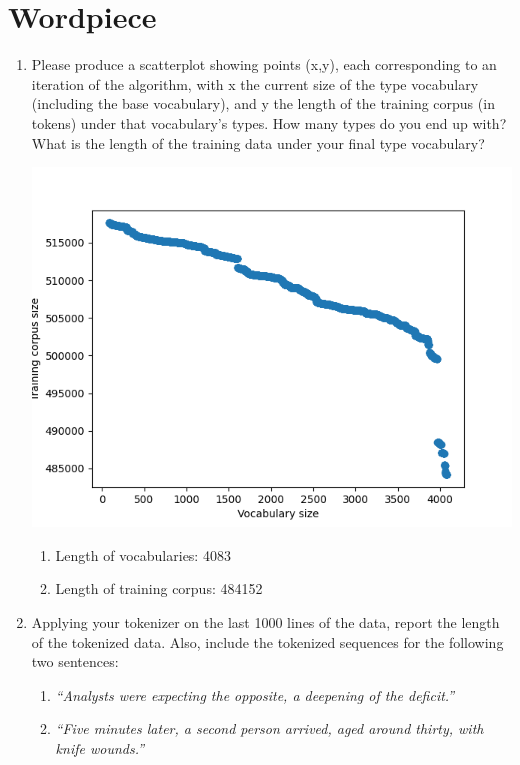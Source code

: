 \documentclass{article}
\newenvironment{solution}{\color{blue}}{}
\begin{document}
\section{Wordpiece}
\begin{enumerate}
  \item Please produce a scatterplot showing points (x,y), each corresponding to 
  an iteration of the algorithm, with x the current size of the type vocabulary 
  (including the base vocabulary), and y the length of the training corpus (in tokens) 
  under that vocabulary's types. How many types do you end up with? What is the 
  length of the training data under your final type vocabulary?

  \begin{solution}
    \begin{center}
      \includegraphics[scale=0.6]{Figure_2.png}
    \end{center}

    \begin{enumerate}[1.]
      \item Length of vocabularies: 4083
      \item Length of training corpus: 484152
    \end{enumerate}
  \end{solution}

  \item Applying your tokenizer on the last 1000 lines of the data, report the 
  length of the tokenized data. Also, include the tokenized sequences for the 
  following two sentences: 

  \begin{enumerate}
      \item \textit{``Analysts were expecting the opposite, a deepening of the deficit.''}
      \item \textit{``Five minutes later, a second person arrived, aged around thirty, with knife wounds.''}
  \end{enumerate}


\end{enumerate}
\end{document}
